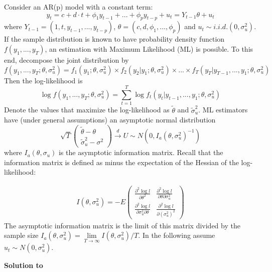 Consider an AR(p) model with a constant term:
$$ y_t = c + d\cdot t + \phi_1 y_{t-1} +... + \phi_p y_{t-p} +u_{t}=Y_{t-1}\theta + u_t$$
where $Y_{t-1}=(1,t, y_{t-1},...,y_{t-p})$, $\theta = (c,d,\phi_1,...,\phi_p)$ and $u_t\sim i.i.d.(0,\sigma_u^2)$. If the sample distribution is known to have probability density function $f(y_1,...,y_T)$, an estimation with Maximum Likelihood (ML) is possible. To this end, decompose the joint distribution by
$$f(y_1,...,y_T;\theta,\sigma_u^2)= f_1(y_1;\theta,\sigma_u^2) \times f_2(y_2|y_1;\theta,\sigma_u^2)\times ... \times f_T(y_T|y_{T-1},...,y_1;\theta,\sigma_u^2)$$ Then the log-likelihood is
$$\log f(y_1,...,y_T;\theta,\sigma_u^2)=\sum_{t=1}^T \log f_t(y_t|y_{t-1},...,y_1;\theta,\sigma_u^2)$$
Denote the values that maximize the log-likelihood as $\tilde{\theta}$ and $\tilde{\sigma}_u^2$. ML estimators have (under general assumptions) an asymptotic normal distribution
$$\sqrt{T}\begin{pmatrix}\tilde{\theta}-\theta\\\tilde{\sigma}^2_u - \sigma^2 \end{pmatrix} \overset{d}{\rightarrow} U \sim N(0,I_a(\theta,\sigma_u^2)^{-1})$$
where $I_a(\theta,\sigma_u)$ is the asymptotic information matrix. Recall that the information matrix is defined  as minus the expectation of the Hessian of the log-likelihood:

\begin{align*}
    I(\theta,\sigma_u^2) = -E
    \begin{pmatrix}
        \frac{\partial^2 \log l}{\partial \theta^2}                    & \frac{\partial^2 \log l}{\partial \theta  \partial \sigma_u^2} \\
        \frac{\partial^2 \log l}{\partial \sigma_u^2  \partial \theta} & \frac{\partial^2 \log l}{\partial (\sigma_u^2)^2}
    \end{pmatrix}
\end{align*}
The asymptotic information matrix is the limit of this matrix divided by the sample size $I_a(\theta, \sigma_u^2)=\lim\limits_{T\rightarrow \infty} I(\theta, \sigma_u^2)/T$.
In the following assume $u_t\sim N(0,\sigma_u^2)$.
\begin{solution}\textbf{Solution to }\end{solution}

